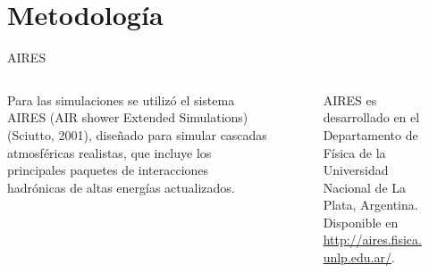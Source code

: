 \documentclass[10pt,xcolor=table]{beamer}
\begin{document}
\section{Metodolog\'ia}
\begin{frame}{AIRES}
	\begin{columns}
		\begin{column}{0.5\textwidth}
		Para las simulaciones se utiliz\'o el sistema AIRES (AIR shower Extended Simulations) (Sciutto, 2001), dise\~{n}ado para simular cascadas atmosf\'ericas realistas, que incluye los principales paquetes de interacciones hadr\'onicas de altas energ\'ias actualizados.\\
		\end{column}
		\begin{column}{0.5\textwidth}
			\begin{center}
				\begin{figure}
				\caption{{\footnotesize AIRES es desarrollado en el Departamento de F\'isica de la Universidad Nacional de La Plata, Argentina. Disponible en \url{http://aires.fisica.unlp.edu.ar/}.}}
				\end{figure}
			\end{center}
		\end{column}	
	
	\end{columns}
\end{frame}
\end{document}

